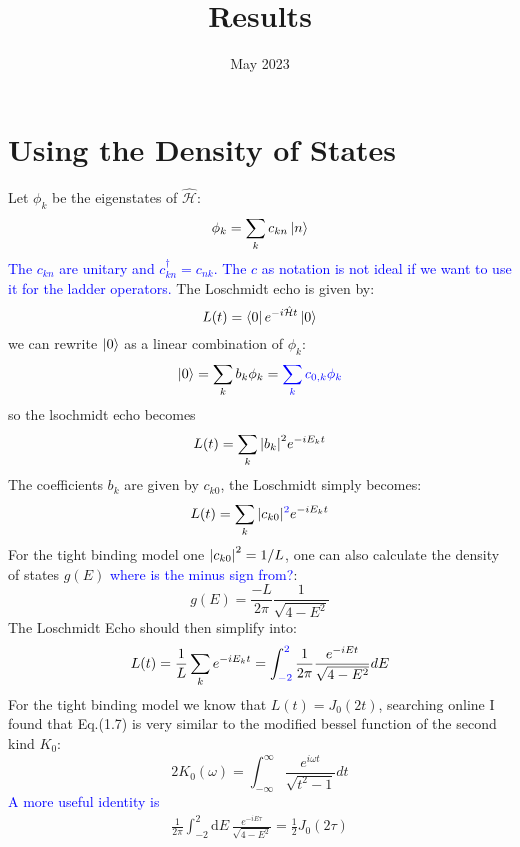 \documentclass{article}
\title{Results}
\date{May 2023}
\numberwithin{equation}{section}
\renewcommand{\H}{\mathcal{\hat{H}}}
\newcommand{\1}{\mathbb{1}}
\newcommand{\bcomment}[1]{\textcolor{blue}{#1}}
\newcommand{\dint}[1]{\mathrm{d}{#1}\,}
\begin{document}
\maketitle
\newpage
\tableofcontents
\newpage
\section{Using the Density of States}
Let $\phi_k$ be the eigenstates of $\H$:
\begin{equation}
    \phi_k=\sum_k c_{kn} \ket{n}
\end{equation}
\bcomment{The $c_{kn}$ are unitary and $c_{kn}^{\dagger} = c_{nk}$. The $c$ as notation is not ideal if we want to use it for the ladder operators. }
The Loschmidt echo is given by:
\begin{equation}
    L(t)=\bra{0}e^{-i\H t}\ket{0}
\end{equation}
we can rewrite $\ket{0}$ as a linear combination of $\phi_k$:
\begin{equation}
    \ket{0}=\sum_k b_k \phi_k = \bcomment{\sum_k c_{0,k} \phi_k}
\end{equation}
so the lsochmidt echo becomes
\begin{equation}
    L(t)=\sum_k \abs{b_k}^2 e^{-iE_kt}
\end{equation}
The coefficients $b_k$ are given by $c_{k0}$, the Loschmidt simply becomes:
\begin{equation}
    L(t)=\sum_k \abs{c_{k0}}\bcomment{^2} e^{-iE_kt }
\end{equation}
For the tight binding model one $\abs{c_{k0}}^2=1/L$, one can also calculate the density of states $g(E)$ \bcomment{where is the minus sign from?}:
\begin{equation}
    g(E)=\frac{-L}{2\pi}\frac{1}{\sqrt{4-E^2}}
\end{equation}
The Loschmidt Echo should then simplify into:
\begin{equation}
    L(t)=\frac{1}{L}\sum_k e^{-iE_k t}=\int_{\bcomment{-2}}^{\bcomment{2}} \frac{1}{2\pi} \frac{e^{-iEt}}{\sqrt{4-E^2}} dE
\end{equation}
For the tight binding model we know that $L(t)=J_0(2t)$, searching online I found that Eq.(1.7) is very similar to the modified bessel function of the second kind $K_0$:
\begin{equation}
    2K_0(\omega)=\int_{-\infty}^\infty \frac{e^{i\omega t}}{\sqrt{t^2-1}}dt
\end{equation}
\bcomment{A more useful identity is}
\begin{align}
  \frac{1}{2\pi}  \int_{-2}^2 \dint{E} \frac{e^{-iE \tau}}{\sqrt{4-E^2}} = \frac{1}{2}J_0(2 \tau)
\end{align}
\end{document}
